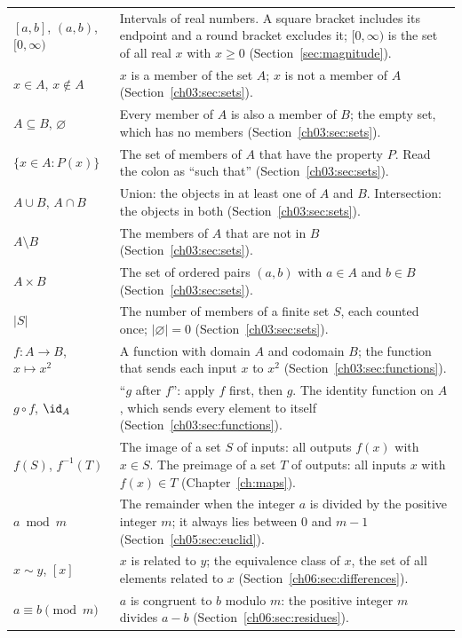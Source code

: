 \begin{longtable}{@{}p{1.25in}p{3.95in}@{}}
$[a,b]$, $(a,b)$, $[0,\infty)$ & Intervals of real numbers. A square bracket includes its endpoint and a round bracket excludes it; $[0,\infty)$ is the set of all real $x$ with $x\ge0$ (Section~\ref{sec:magnitude}).\\
$x\in A$, $x\notin A$ & $x$ is a member of the set $A$; $x$ is not a member of $A$ (Section~\ref{ch03:sec:sets}).\\
$A\subseteq B$, $\varnothing$ & Every member of $A$ is also a member of $B$; the empty set, which has no members (Section~\ref{ch03:sec:sets}).\\
$\{x\in A:P(x)\}$ & The set of members of $A$ that have the property $P$. Read the colon as ``such that'' (Section~\ref{ch03:sec:sets}).\\
$A\cup B$, $A\cap B$ & Union: the objects in at least one of $A$ and $B$. Intersection: the objects in both (Section~\ref{ch03:sec:sets}).\\
$A\setminus B$ & The members of $A$ that are not in $B$ (Section~\ref{ch03:sec:sets}).\\
$A\times B$ & The set of ordered pairs $(a,b)$ with $a\in A$ and $b\in B$ (Section~\ref{ch03:sec:sets}).\\
$|S|$ & The number of members of a finite set $S$, each counted once; $|\varnothing|=0$ (Section~\ref{ch03:sec:sets}).\\
$f:A\to B$, $x\mapsto x^2$ & A function with domain $A$ and codomain $B$; the function that sends each input $x$ to $x^2$ (Section~\ref{ch03:sec:functions}).\\
$g\circ f$, $\id_A$ & ``$g$ after $f$'': apply $f$ first, then $g$. The identity function on $A$, which sends every element to itself (Section~\ref{ch03:sec:functions}).\\
$f(S)$, $f^{-1}(T)$ & The image of a set $S$ of inputs: all outputs $f(x)$ with $x\in S$. The preimage of a set $T$ of outputs: all inputs $x$ with $f(x)\in T$ (Chapter~\ref{ch:maps}).\\
$a\bmod m$ & The remainder when the integer $a$ is divided by the positive integer $m$; it always lies between $0$ and $m-1$ (Section~\ref{ch05:sec:euclid}).\\
$x\sim y$, $[x]$ & $x$ is related to $y$; the equivalence class of $x$, the set of all elements related to $x$ (Section~\ref{ch06:sec:differences}).\\
$a\equiv b\pmod m$ & $a$ is congruent to $b$ modulo $m$: the positive integer $m$ divides $a-b$ (Section~\ref{ch06:sec:residues}).\\

\end{longtable}
